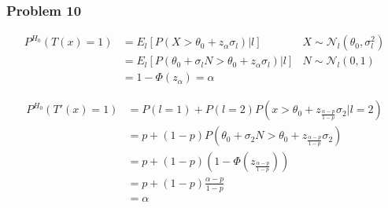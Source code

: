 \documentclass[12pt]{article}
\newcommand{\Q}[1]{\subsubsection*{Problem #1}}
\begin{document}
\Q{10}
\begin{align}
P^{H_0}(T(x) = 1) &= E_l[P(X > \theta_0 + z_{\alpha} \sigma_l) | l] & X \sim \mathcal N_l(\theta_0, \sigma_l^2)\\
&= E_l[P(\theta_0 + \sigma_l N > \theta_0 + z_{\alpha} \sigma_l) | l] & N \sim \mathcal N_l(0, 1)\\
&= 1 - \Phi(z_{\alpha}) = \alpha
\end{align}


\begin{align}
P^{H_0}(T'(x) = 1) &= P(l = 1) + P(l = 2)P(x > \theta_0  + z_{\frac{\alpha-p}{1-p}}\sigma_2 | l=2) \\
&= p + (1-p) P(\theta_0 + \sigma_2 N > \theta_0  + z_{\frac{\alpha-p}{1-p}}\sigma_2) \\
&= p + (1-p) (1-\Phi(z_{\frac{\alpha-p}{1-p}}))\\
&= p + (1-p)\frac{\alpha-p}{1-p}\\
&= \alpha
\end{align}
\end{document}
